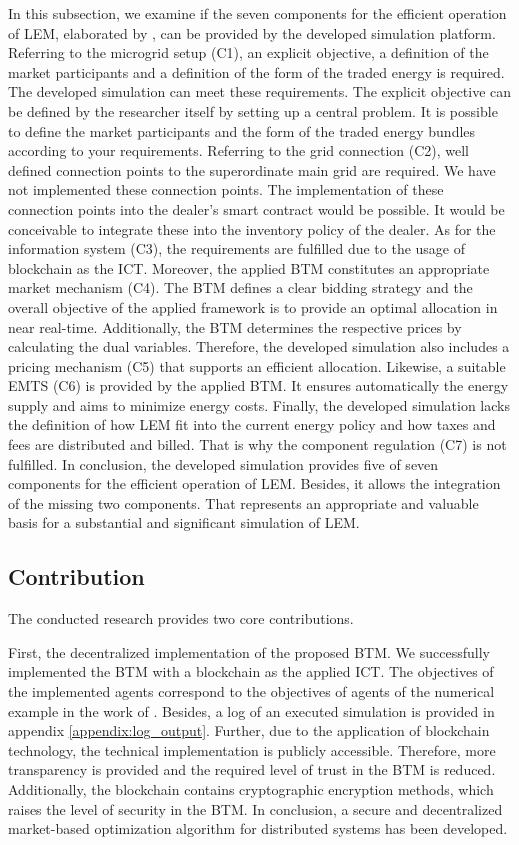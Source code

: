 In this subsection, we examine if the seven components for the efficient operation of LEM,
 elaborated by , can be 
provided by the developed simulation platform.
Referring to the microgrid setup (C1), an explicit objective, a definition of the market participants and a definition of the form of the traded energy is required. The developed simulation can meet these requirements. The explicit objective can be defined by the researcher itself by setting up a central problem. It is possible to define the market participants and the form of the traded energy bundles
according to your requirements.
Referring to the grid connection (C2), well defined connection points to the superordinate main grid are required.
We have not implemented these connection points. 
The implementation of these connection points into the dealer's smart contract would be possible. 
It would be conceivable to integrate these into the inventory policy of the dealer.
As for the information system (C3), the requirements are fulfilled due to the usage of blockchain as the ICT.
Moreover, the applied BTM constitutes an appropriate market mechanism (C4). The BTM defines a clear bidding strategy and the overall objective of the applied framework is to provide an optimal allocation in near real-time. 
Additionally, the BTM determines the respective prices by calculating the dual variables.
Therefore, the developed simulation also includes a pricing mechanism (C5) that supports an efficient allocation.
Likewise, a suitable EMTS (C6) is provided by the applied BTM. 
It ensures automatically the energy supply and aims to minimize energy costs.
Finally, the developed simulation lacks the definition of how LEM fit into the current energy policy and how taxes and fees are distributed and billed. 
That is why the component regulation (C7) is not fulfilled. 
In conclusion, the developed simulation provides five of seven components for the efficient operation of LEM. 
Besides, it allows the integration of the missing two components.
That represents an appropriate and valuable basis for a substantial and significant simulation of LEM. 

\subsection{Contribution}
The conducted research provides two core contributions.

First, the decentralized implementation of the proposed BTM. 
We successfully implemented the BTM with a blockchain as the applied ICT. 
The objectives of the implemented agents correspond to the 
objectives of agents of the numerical example in the work of .
Besides, a log of an executed simulation is provided in appendix \ref{appendix:log_output}.
Further, due to the application of blockchain technology, the technical implementation
is publicly accessible.
Therefore, more transparency is provided and the required level of trust in the BTM
is reduced. Additionally, the blockchain contains cryptographic encryption methods,
which raises the level of security in the BTM.
In conclusion, a secure and decentralized market-based optimization algorithm for distributed systems has 
been developed.

